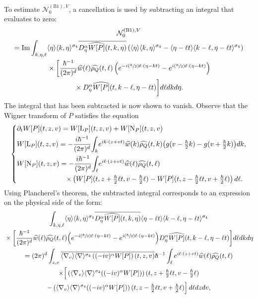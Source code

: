 \documentclass[JEP,XML,SOM,Unicode]{cedram}
\newcommand{\Psfrac}[2]{(\sfrac{#1}{#2})}
\newenvironment{mycases}
{\begin{dcases*}}
{\end{dcases*}}
\theoremstyle{plain}
\theoremstyle{remark}
\newcommand{\br}[1]{\left(#1\right)}
\newcommand{\bbr}[1]{\bigl(#1 \bigr)}
\newcommand{\Bbr}[1]{\Bigl(#1 \Bigr)}
\newcommand{\p}{\partial}
\newcommand{\jb}[1]{\langle#1\rangle}
\newcommand{\mytextfrac}[2]{{\textstyle\frac{#1}{#2}}}
\begin{document}
\pagebreak[2]
To estimate \(\mathcal{N}_0^{\mathrm{(B1)},V}\), a cancellation is used by subtracting an integral that evaluates to zero:
\begin{multline}\label{N0B1}
\mathcal{N}_0^{\mathrm{(B1)},V}\\
=\Im\int_{k,\eta,\ell}\jb{\eta}\jb{k,\eta}^{\sigma_4}\overline{D_\eta^\alpha \widehat{W[P]}(t,k,\eta)}\br{\jb{\eta}\jb{k,\eta}^{\sigma_4}-\jb{\eta-\ell t}\jb{k-\ell ,\eta-\ell t}^{\sigma_4}}\\
{}\times\biggl[\frac{\hbar^{-1}}{(2\pi)^d} \widehat{w}(\ell )\widehat{\rho_Q}(t,\ell )\br{e^{-i\Psfrac{\hbar}{2}\ell \cdot(\eta-kt)}-e^{i\Psfrac{\hbar}{2}\ell \cdot(\eta-kt)}}\\
{}\times D_\eta^\alpha\widehat{W[P]}(t,k-\ell ,\eta-\ell t)\biggr] d\ell dkd\eta.
\end{multline}
The integral that has been subtracted is now shown to vanish. Observe that the Wigner transform of \(P\) satisfies the equation\begin{align}\label{Wphysical}
\begin{mycases}
\p_tW[P](t,z,v)=W[{\mathrm{L}_P}](t,z,v)+W[{\mathrm{N}_P}](t,z,v)\\
W[{\mathrm{L}_P}](t,z,v)=-\frac{i\hbar^{-1}}{(2\pi)^d}\!\int_k\!e^{ik\cdot(z+vt)}\widehat w(k)\widehat{\rho_Q}(t,k)\bbr{g(v-\mytextfrac{\hbar}{2}k)-g(v+\mytextfrac{\hbar}{2}k)}dk,\\
W[{\mathrm{N}_P}](t,z,v)=-\frac{i\hbar^{-1}}{(2\pi)^d}\!\int_\ell\! e^{i\ell \cdot(z+vt)}\widehat w(\ell )\widehat{\rho_Q}(t,\ell )\\
\hspace{2.5cm}\times\br{W[P](t,z+\mytextfrac{\hbar}{2}\ell t,v-\mytextfrac{\hbar}{2}\ell )-W[P](t,z-\mytextfrac{\hbar}{2}\ell t,v+\mytextfrac{\hbar}{2}\ell )}d\ell.
\end{mycases}
\end{align}
Using Plancherel's theorem, the subtracted integral corresponds to an expression on the physical side of the form:
\begin{multline*}
\int_{k,\eta,\ell}\jb{\eta}\jb{k,\eta}^{\sigma_4}\overline{D_\eta^\alpha \widehat{W[P]}(t,k,\eta)}\jb{\eta-\ell t}\jb{k-\ell ,\eta-\ell t}^{\sigma_4}\\
{}\times\biggl[\frac{\hbar^{-1}}{(2\pi)^d} \widehat{w}(\ell )\widehat{\rho_Q}(t,\ell )\Bbr{e^{-i\Psfrac{\hbar}{2}\ell \cdot(\eta-kt)}-e^{i\Psfrac{\hbar}{2}\ell \cdot(\eta-kt)}}D_\eta^\alpha\widehat{W[P]}(t,k-\ell ,\eta-\ell t) \biggr]d\ell dkd\eta\\
=(2\pi)^d\int_{z,v}\overline{\jb{\nabla_v}\jb{\nabla}^{\sigma_4}\br{(-iv)^\alpha W[P]}(t,z,v)}\hbar^{-1}\int_\ell e^{i\ell \cdot(z+vt)}\widehat w(\ell )\widehat{\rho_Q}(t,\ell )\\
\times\Big[\br{\jb{\nabla_v}\jb{\nabla}^{\sigma_4}((-iv)^\alpha W[P])}(t,z+\mytextfrac{\hbar}{2}\ell t,v-\mytextfrac{\hbar}{2}\ell )\\
-\br{\jb{\nabla_v}\jb{\nabla}^{\sigma_4}((-iv)^\alpha W[P])}(t,z-\mytextfrac{\hbar}{2}\ell t,v+\mytextfrac{\hbar}{2}\ell )\Big]\,d\ell dzdv,
\end{multline*}
\end{document}
